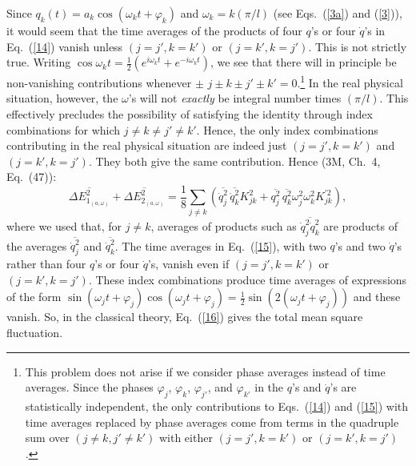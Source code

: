 \documentclass{elsart}
\begin{document}
Since $q_k(t) = a_k \cos{(\omega_k t + \varphi_k)}$ and $\omega_k = k (\pi/l)$ (see Eqs.\ (\ref{3a}) and (\ref{3})), it would seem that the time averages of the products of four $q$'s or four $\dot{q}$'s in Eq.\ (\ref{14}) vanish unless $(j=j', k=k')$ or $(j=k', k=j')$. This is not strictly true. Writing $\cos{\omega_k}t = \frac{1}{2} \left( e^{i \omega_k t} + e^{- i \omega_k t} \right)$, we see that there will in principle be non-vanishing contributions whenever $\pm \,\, j \pm k \pm j' \pm k' = 0$.\footnote{This problem does not arise if we consider phase averages instead of time averages. Since the phases $\varphi_j$, $\varphi_k$, $\varphi_{j'}$, and $\varphi_{k'}$ in the $q$'s and $\dot{q}$'s are statistically independent, the only contributions to Eqs.\ (\ref{14}) and (\ref{15}) with time averages replaced by phase averages
come from terms in the quadruple sum over $(j \neq k, j' \neq k')$ with either $(j=j', k=k')$ or $(j=k', k=j')$.}  In the real physical situation, however, the $\omega$'s will not {\it exactly} be integral number times $(\pi/l)$. This effectively precludes the possibility of satisfying the identity through index combinations for which $j \neq k \neq j' \neq k'$. Hence, the only index combinations contributing in the real physical situation are indeed just $(j=j', k=k')$ and $(j=k', k=j')$. They both give the same contribution. Hence (3M, Ch.\ 4, Eq.\ (47)):
\begin{equation}
\overline{\Delta E_{1_{(a, \omega)}}^2} + \overline{\Delta E_{2_{(a, \omega)}}^2} =
\frac{1}{8}  \sum_{j \neq k} \left(  \overline{\dot{q}_j^2} \, \overline{\dot{q}_k^2} K_{jk}^2
+ \overline{q_j^2} \, \overline{q_k^2} \omega_j^2 \omega_k^2 K_{jk}^{\prime 2} \right),
\label{16}
\end{equation}
where we used that, for $j \neq k$, averages of products such as $\overline{ \dot{q}_j^2 \dot{q}_k^2 }$ are products of the averages
$\overline{\dot{q}_j^2}$ and $\overline{\dot{q}_k^2}$. The time averages in Eq.\ (\ref{15}), with two $q$'s and two $\dot{q}$'s rather than four $q$'s or four $\dot{q}$'s, vanish even if $(j=j', k=k')$ or $(j=k', k=j')$. These index combinations produce time averages of expressions of the form $\sin{(\omega_jt + \varphi_j)} \cos{(\omega_jt + \varphi_j)} = \frac{1}{2} \sin{(2(\omega_jt + \varphi_j))}$ and these vanish. So, in the classical theory, Eq.\ (\ref{16}) gives the total mean square fluctuation.
\end{document}
